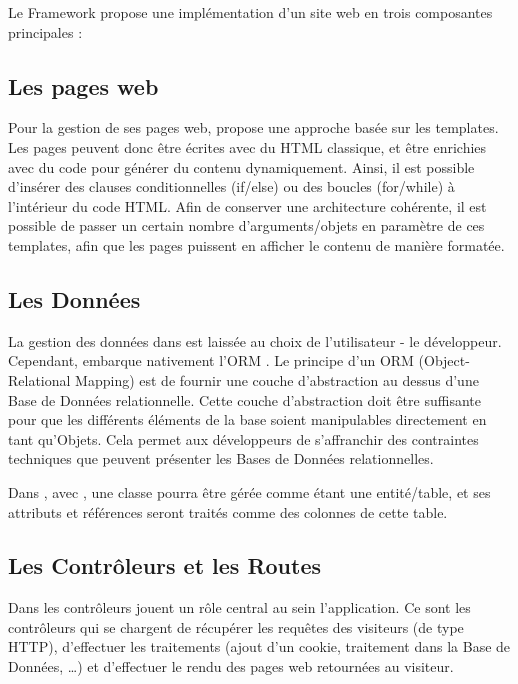 Le Framework \kwplay{} propose une implémentation d'un site web en trois composantes principales :


\subsection{Les pages web}
Pour la gestion de ses pages web, \kwplay{} propose une approche basée sur les templates. Les pages peuvent donc être écrites avec du HTML classique, et être enrichies avec du code \kwscala{} pour générer du contenu dynamiquement. Ainsi, il est possible d'insérer des clauses conditionnelles (if/else) ou des boucles (for/while) à l'intérieur du code HTML. Afin de conserver une architecture cohérente, il est possible de passer un certain nombre d'arguments/objets en paramètre de ces templates, afin que les pages puissent en afficher le contenu de manière formatée.

\subsection{Les Données}
La gestion des données dans \kwplay{} est laissée au choix de l'utilisateur - le développeur. Cependant, \kwplay{} embarque nativement l'ORM \kwebean{}. Le principe d'un ORM (Object-Relational Mapping) est de fournir une couche d'abstraction au dessus d'une Base de Données relationnelle. Cette couche d'abstraction doit être suffisante pour que les différents éléments de la base soient manipulables directement en tant qu'Objets. Cela permet aux développeurs de s'affranchir des contraintes techniques que peuvent présenter les Bases de Données relationnelles.

Dans \kwplay{}, avec \kwebean{}, une classe \kwjava{} pourra être gérée comme étant une entité/table, et ses attributs et références seront traités comme des colonnes de cette table.

\subsection{Les Contrôleurs et les Routes}
Dans \kwplay{} les contrôleurs jouent un rôle central au sein l'application. Ce sont les contrôleurs qui se chargent de récupérer les requêtes des visiteurs (de type HTTP), d'effectuer les traitements (ajout d'un cookie, traitement dans la Base de Données, \dots) et d'effectuer le rendu des pages web retournées au visiteur.

